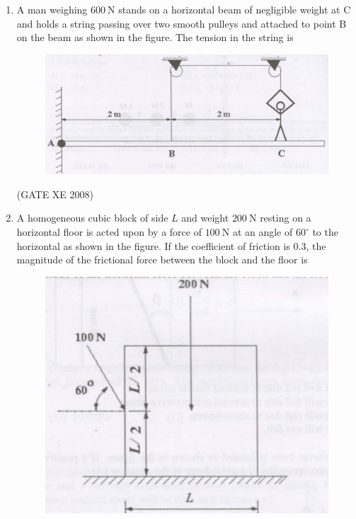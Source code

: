 \documentclass[12pt]{article}
\begin{document}
\begin{enumerate}
\begin{enumerate}
\end{enumerate}
    
    (GATE XE 2008)


    \item A man weighing $600 \ \mathrm{N}$ stands on a horizontal beam of negligible weight at C and holds a string passing over two smooth pulleys and attached to point B on the beam as shown in the figure. The tension in the string is

    \begin{figure}[H]
    \centering
    \includegraphics[width=0.5\columnwidth]{figs/ass1_f_q17.png}
    \caption{}
    \end{figure}

\begin{enumerate}
\end{enumerate}

    (GATE XE 2008)

    \item A homogeneous cubic block of side $L$ and weight $200 \ \mathrm{N}$ resting on a horizontal floor is acted upon by a force of $100 \ \mathrm{N}$ at an angle of $60^{\circ}$ to the horizontal as shown in the figure. If the coefficient of friction is $0.3$, the magnitude of the frictional force between the block and the floor is

    \begin{figure}[H]
    \centering
    \includegraphics[width=0.5\columnwidth]{figs/ass1_f_q18.png}
    \caption{}
    \end{figure}


\end{enumerate}
\end{document}
